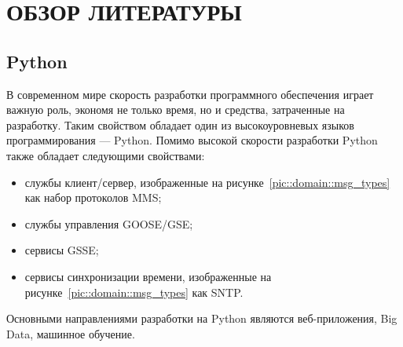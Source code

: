 \section{ОБЗОР ЛИТЕРАТУРЫ}
\label{sec:domain}


\subsection{Python}
В современном мире скорость разработки программного обеспечения играет важную роль,
экономя не только время, но и средства, затраченные на разработку.
Таким свойством обладает один из высокоуровневых языков программирования — Python.
Помимо высокой скорости разработки Python также обладает следующими свойствами:
\begin{itemize}
    \item службы клиент/сервер, изображенные на рисунке~\ref{pic::domain::msg_types} как набор протоколов MMS;
    \item службы управления GOOSE/GSE;
    \item сервисы GSSE;
    \item сервисы синхронизации времени, изображенные на рисунке~\ref{pic::domain::msg_types} как SNTP.
\end{itemize}

Основными направлениями разработки на Python являются веб-приложения, Big Data, машинное обучение.

